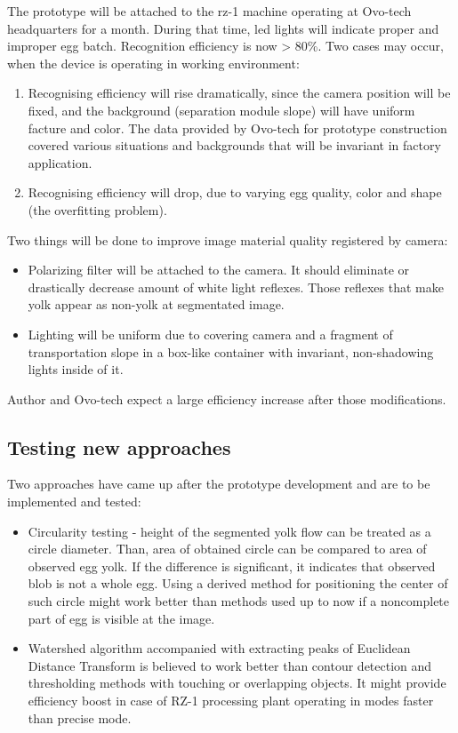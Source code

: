 \documentclass[12pt,twoside,a4paper]{article}
\begin{document}
The prototype will be attached to the rz-1 machine operating at Ovo-tech headquarters for a month.
During that time, led lights will indicate proper and improper egg batch.
Recognition efficiency is now > 80\%. Two cases may occur, when the device is operating in working environment:
\begin{enumerate}
\item Recognising efficiency will rise dramatically, since the camera position will be fixed, and the background (separation module slope) will have uniform facture and color.
The data provided by Ovo-tech for prototype construction covered various situations and backgrounds that will be invariant in factory application.
\item Recognising efficiency will drop, due to varying egg quality, color and shape (the overfitting problem).
\end{enumerate}

Two things will be done to improve image material quality registered by camera:
\begin{itemize}
\item Polarizing filter will be attached to the camera.
It should eliminate or drastically decrease amount of white light reflexes.
Those reflexes that make yolk appear as non-yolk at segmentated image.
\item Lighting will be uniform due to covering camera and a fragment of transportation slope in a box-like container with invariant, non-shadowing lights inside of it.
\end{itemize}

Author and Ovo-tech expect a large efficiency increase after those modifications.
\subsection{Testing new approaches}

Two approaches have came up after the prototype development and are to be implemented and tested:

\begin{itemize}
\item Circularity testing - height of the segmented yolk flow can be treated as a circle diameter. Than, area of obtained circle can be compared to area of observed egg yolk. If the difference is significant, it indicates that observed blob is not a whole egg.
Using a derived method for positioning the center of such circle might work better than methods used up to now if a noncomplete part of egg is visible at the image.
\item Watershed algorithm accompanied with extracting peaks of Euclidean Distance Transform is believed to work better than contour detection and thresholding methods with touching or overlapping objects.
It might provide efficiency boost in case of RZ-1 processing plant operating in modes faster than precise mode.\cite{watershed}
\end{itemize}
\end{document}
